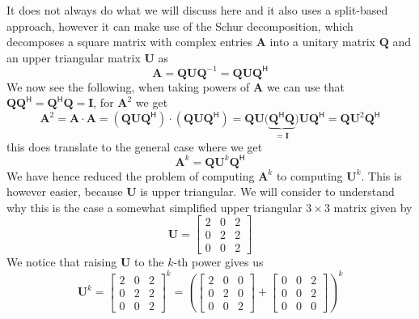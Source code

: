 \documentclass{article}
\begin{document}
It does not always do what we will discuss here and it also uses a split-based approach, however it can make use of the Schur decomposition, which decomposes a square matrix with complex entries $\mathbf{A}$ into a unitary matrix $\mathbf{Q}$ and an upper triangular matrix $\mathbf{U}$ as
\begin{equation*}
    \mathbf{A} = \mathbf{Q}\mathbf{U}\mathbf{Q}^{-1} = \mathbf{Q}\mathbf{U}\mathbf{Q}^{\mathsf{H}}
\end{equation*}
We now see the following, when taking powers of $\mathbf{A}$ we can use that $\mathbf{Q}\mathbf{Q}^{\mathsf{H}} = \mathbf{Q}^{\mathsf{H}}\mathbf{Q} = \mathbf{I}$, for $\mathbf{A}^{2}$ we get
\begin{equation*}
    \mathbf{A}^{2} = \mathbf{A} \cdot \mathbf{A} = \left(\mathbf{Q}\mathbf{U}\mathbf{Q}^{\mathsf{H}}\right)\cdot\left(\mathbf{Q}\mathbf{U}\mathbf{Q}^{\mathsf{H}}\right) = \mathbf{Q}\mathbf{U}\big(\underbrace{\mathbf{Q}^{\mathsf{H}}\mathbf{Q}}_{= \mathbf{I}}\big)\mathbf{U}\mathbf{Q}^{\mathsf{H}} 
    = \mathbf{Q}\mathbf{U}^{2}\mathbf{Q}^{\mathsf{H}}
\end{equation*}
this does translate to the general case where we get
\begin{equation*}
    \mathbf{A}^{k} = \mathbf{Q}\mathbf{U}^{k}\mathbf{Q}^{\mathsf{H}}
\end{equation*}
We have hence reduced the problem of computing $\mathbf{A}^{k}$ to computing $\mathbf{U}^{k}$. This is however easier, because $\mathbf{U}$ is upper triangular. We will consider to understand why this is the case a somewhat simplified upper triangular $3 \times 3$ matrix given by
\begin{equation*}
    \mathbf{U} = \begin{bmatrix}
    2 & 0 & 2 \\
    0 & 2 & 2 \\
    0 & 0 & 2
    \end{bmatrix}
\end{equation*}
We notice that raising $\mathbf{U}$ to the $k$-th power gives us
\begin{equation*}
     \mathbf{U}^{k} = \begin{bmatrix}
    2 & 0 & 2 \\
    0 & 2 & 2 \\
    0 & 0 & 2
    \end{bmatrix}^{k} = \left(\begin{bmatrix}
    2 & 0 & 0 \\
    0 & 2 & 0 \\
    0 & 0 & 2
\end{bmatrix} + \begin{bmatrix}
    0 & 0 & 2 \\
    0 & 0 & 2 \\
    0 & 0 & 0
   \end{bmatrix}\right)^{k}
\end{equation*}
\end{document}
